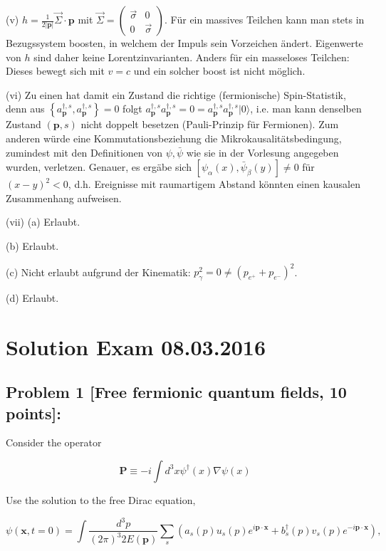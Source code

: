 \documentclass[10pt, letterpaper]{article}
\begin{document}
(v) $h=\frac{1}{2|\mathbf{p}|} \vec{\Sigma} \cdot \mathbf{p}$ mit $\vec{\Sigma}=\left(\begin{array}{cc}\vec{\sigma} & 0 \\ 0 & \vec{\sigma}\end{array}\right)$. Für ein massives Teilchen kann man stets in Bezugssystem boosten, in welchem der Impuls sein Vorzeichen ändert. Eigenwerte von $h$ sind daher keine Lorentzinvarianten. Anders für ein masseloses Teilchen: Dieses bewegt sich mit $v=c$ und ein solcher boost ist nicht möglich.

(vi) Zu einen hat damit ein Zustand die richtige (fermionische) Spin-Statistik, denn aus $\left\{a_{\mathbf{p}}^{\dagger, s}, a_{\mathbf{p}}^{\dagger, s}\right\}=0$ folgt $a_{\mathbf{p}}^{\dagger, s} a_{\mathbf{p}}^{\dagger, s}=0=a_{\mathbf{p}}^{\dagger, s} a_{\mathbf{p}}^{\dagger, s}|0\rangle$, i.e. man kann denselben Zustand $(\mathbf{p}, s)$ nicht doppelt besetzen (Pauli-Prinzip für Fermionen). Zum anderen würde eine Kommutationsbeziehung die Mikrokausalitätsbedingung, zumindest mit den Definitionen von $\psi, \bar{\psi}$ wie sie in der Vorlesung angegeben wurden, verletzen. Genauer, es ergäbe sich $\left[\psi_\alpha(x), \bar{\psi}_\beta(y)\right] \neq 0$ für $(x-y)^2<0$, d.h. Ereignisse mit raumartigem Abstand könnten einen kausalen Zusammenhang aufweisen.

(vii) (a) Erlaubt.

(b) Erlaubt.

(c) Nicht erlaubt aufgrund der Kinematik: $p_\gamma^2=0 \neq\left(p_{e^{+}}+p_{e^{-}}\right)^2$.

(d) Erlaubt.

\pagebreak


\section{Solution Exam 08.03.2016}

\subsection{Problem 1 [Free fermionic quantum fields, 10 points]:}
Consider the operator

$$
\mathbf{P} \equiv-i \int d^3 x \psi^{\dagger}(x) \nabla \psi(x)
$$


Use the solution to the free Dirac equation,

$$
\psi(\mathbf{x}, t=0)=\int \frac{d^3 p}{(2 \pi)^3 2 E(\mathbf{p})} \sum_s\left(a_s(p) u_s(p) e^{i \mathbf{p} \cdot \mathbf{x}}+b_s^{\dagger}(p) v_s(p) e^{-i \mathbf{p} \cdot \mathbf{x}}\right),
$$
\end{document}
